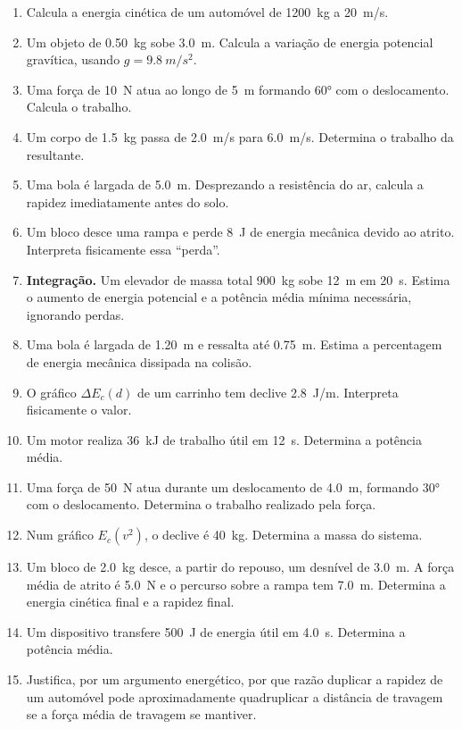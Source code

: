 \documentclass[11pt,a4paper,oneside]{book}
\begin{document}
\begin{exercicios}
\begin{enumerate}
  \item Calcula a energia cinética de um automóvel de \SI{1200}{kg} a \SI{20}{m/s}.
  \item Um objeto de \SI{0.50}{kg} sobe \SI{3.0}{m}. Calcula a variação de energia potencial gravítica, usando $g=\SI{9.8}{m/s^2}$.
  \item Uma força de \SI{10}{N} atua ao longo de \SI{5}{m} formando \ang{60} com o deslocamento. Calcula o trabalho.
  \item Um corpo de \SI{1.5}{kg} passa de \SI{2.0}{m/s} para \SI{6.0}{m/s}. Determina o trabalho da resultante.
  \item Uma bola é largada de \SI{5.0}{m}. Desprezando a resistência do ar, calcula a rapidez imediatamente antes do solo.
  \item Um bloco desce uma rampa e perde \SI{8}{J} de energia mecânica devido ao atrito. Interpreta fisicamente essa ``perda''.
  \item \textbf{Integração.} Um elevador de massa total \SI{900}{kg} sobe \SI{12}{m} em \SI{20}{s}. Estima o aumento de energia potencial e a potência média mínima necessária, ignorando perdas.
  \item Uma bola é largada de \SI{1.20}{m} e ressalta até \SI{0.75}{m}. Estima a percentagem de energia mecânica dissipada na colisão.
  \item O gráfico $\Delta E_c(d)$ de um carrinho tem declive \SI{2.8}{J/m}. Interpreta fisicamente o valor.
  \item Um motor realiza \SI{36}{kJ} de trabalho útil em \SI{12}{s}. Determina a potência média.
  \item Uma força de \SI{50}{N} atua durante um deslocamento de \SI{4.0}{m}, formando \ang{30} com o deslocamento. Determina o trabalho realizado pela força.
  \item Num gráfico $E_c(v^2)$, o declive é \SI{40}{kg}. Determina a massa do sistema.
  \item Um bloco de \SI{2.0}{kg} desce, a partir do repouso, um desnível de \SI{3.0}{m}. A força média de atrito é \SI{5.0}{N} e o percurso sobre a rampa tem \SI{7.0}{m}. Determina a energia cinética final e a rapidez final.
  \item Um dispositivo transfere \SI{500}{J} de energia útil em \SI{4.0}{s}. Determina a potência média.
  \item Justifica, por um argumento energético, por que razão duplicar a rapidez de um automóvel pode aproximadamente quadruplicar a distância de travagem se a força média de travagem se mantiver.
\end{enumerate}
\end{exercicios}
\end{document}
